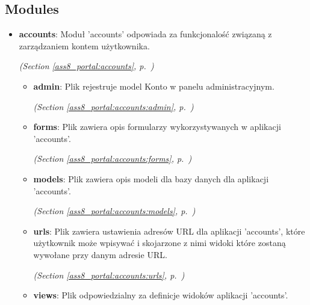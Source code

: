 
\subsection{Modules}

\begin{itemize}
\setlength{\parskip}{0ex}
\item \textbf{accounts}: Moduł 'accounts' odpowiada za funkcjonalość związaną z zarządzaniem kontem 
użytkownika.



  \textit{(Section \ref{ass8_portal:accounts}, p.~\pageref{ass8_portal:accounts})}

  \begin{itemize}
\setlength{\parskip}{0ex}
    \item \textbf{admin}: Plik rejestruje model Konto w panelu administracyjnym.



  \textit{(Section \ref{ass8_portal:accounts:admin}, p.~\pageref{ass8_portal:accounts:admin})}

    \item \textbf{forms}: Plik zawiera opis formularzy wykorzystywanych w aplikacji 'accounts'.



  \textit{(Section \ref{ass8_portal:accounts:forms}, p.~\pageref{ass8_portal:accounts:forms})}

    \item \textbf{models}: Plik zawiera opis modeli dla bazy danych dla aplikacji 'accounts'.



  \textit{(Section \ref{ass8_portal:accounts:models}, p.~\pageref{ass8_portal:accounts:models})}

    \item \textbf{urls}: 
Plik zawiera ustawienia adresów URL dla aplikacji 'accounts', 
które użytkownik może wpisywać i skojarzone z nimi widoki które zostaną wywołane przy 
danym adresie URL. 


  \textit{(Section \ref{ass8_portal:accounts:urls}, p.~\pageref{ass8_portal:accounts:urls})}

    \item \textbf{views}: Plik odpowiedzialny za definicje widoków aplikacji 'accounts'.




\end{itemize}
\end{itemize}
